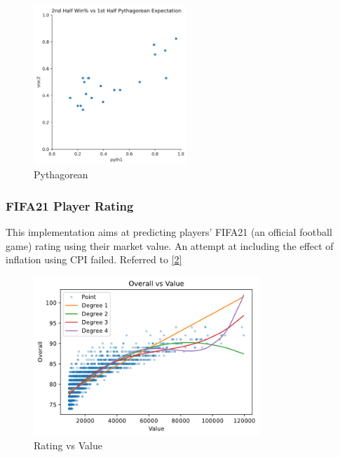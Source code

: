\documentclass[
  english,
  doc,floatsintext]{apa6}
\begin{document}
\begin{figure}[H]
  \begin{center}
  \includegraphics[width=0.9\linewidth, height=6cm]{assets/pythagorean.png}
  \end{center}
  
  \captionsetup{justification=centering}
  \caption{Pythagorean}
\end{figure}

\hypertarget{fifa21-player-rating}{%
\subsubsection{FIFA21 Player Rating}\label{fifa21-player-rating}}

This implementation aims at predicting players' FIFA21 (an official football game) rating using their market value. An attempt at including the effect of inflation using CPI failed. Referred to \protect\hyperlink{ref-chazan-pantzalisSportsAnalyticsAlgorithms2020}{{[}2{]}}

\begin{figure}[H]
  \begin{center}
  \includegraphics[width=0.9\linewidth, height=6cm]{assets/Overall vs Value.png}
  \end{center}
  
  \captionsetup{justification=centering}
  \caption{Rating vs Value}
  \end{figure}
\end{document}
